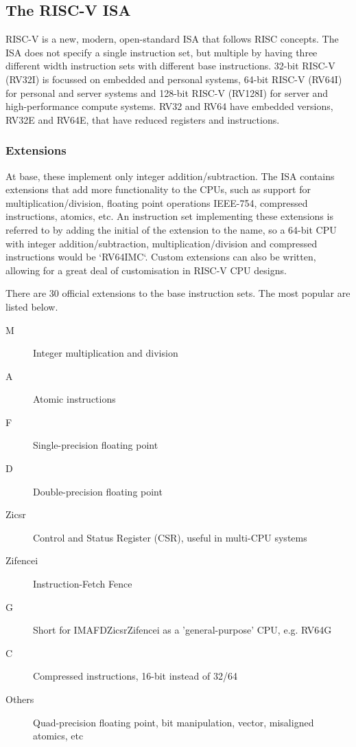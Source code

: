 \subsection{The RISC-V ISA}
RISC-V is a new, modern, open-standard ISA that follows RISC concepts. The ISA does not specify a single instruction set, but multiple by having three different width instruction sets with different base instructions. 32-bit RISC-V (RV32I) is focussed on embedded and personal systems, 64-bit RISC-V (RV64I) for personal and server systems and 128-bit RISC-V (RV128I) for server and high-performance compute systems. RV32 and RV64 have embedded versions, RV32E and RV64E, that have reduced registers and instructions.

\subsubsection{Extensions}
At base, these implement only integer addition/subtraction. The ISA contains extensions that add more functionality to the CPUs, such as support for multiplication/division, floating point operations IEEE-754, compressed instructions, atomics, etc. An instruction set implementing these extensions is referred to by adding the initial of the extension to the name, so a 64-bit CPU with integer addition/subtraction, multiplication/division and compressed instructions would be `RV64IMC`. Custom extensions can also be written, allowing for a great deal of customisation in RISC-V CPU designs.

There are 30 official extensions to the base instruction sets. The most popular are listed below.
\begin{description}
    \item[M] Integer multiplication and division
    \item[A] Atomic instructions
    \item[F] Single-precision floating point
    \item[D] Double-precision floating point
    \item[Zicsr] Control and Status Register (CSR), useful in multi-CPU systems
    \item[Zifencei] Instruction-Fetch Fence
    \item[G] Short for IMAFDZicsrZifencei as a 'general-purpose' CPU, e.g. RV64G
    \item[C] Compressed instructions, 16-bit instead of 32/64
    \item[Others] Quad-precision floating point, bit manipulation, vector, misaligned atomics, etc
\end{description}

